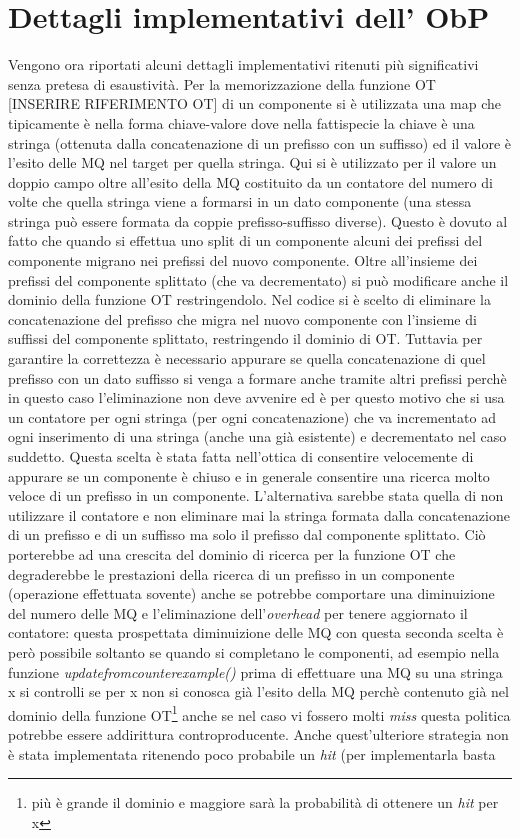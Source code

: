 \section[Dett. impl. ObP]{Dettagli implementativi dell' ObP} 
Vengono ora riportati alcuni dettagli implementativi ritenuti più significativi senza pretesa di esaustività.
Per la memorizzazione della funzione OT [INSERIRE RIFERIMENTO OT] di un componente si è utilizzata una map che tipicamente è nella forma chiave-valore dove nella fattispecie la chiave è una stringa (ottenuta dalla concatenazione di un prefisso con un suffisso) ed il valore è l'esito delle \ac{MQ} nel target per quella stringa. Qui si è utilizzato per il valore un doppio campo oltre all'esito della \ac{MQ} costituito da un contatore del numero di volte che quella stringa viene a formarsi in un dato componente (una stessa stringa può essere formata da  coppie prefisso-suffisso diverse). Questo è dovuto al fatto che quando si effettua uno split di un componente alcuni dei prefissi del componente migrano nei prefissi del nuovo componente. Oltre all'insieme dei prefissi del componente splittato (che va decrementato) si può modificare anche il dominio della funzione OT restringendolo. Nel codice si è scelto di eliminare la concatenazione del prefisso che migra nel nuovo componente con l'insieme di suffissi del componente splittato, restringendo il dominio di OT. Tuttavia per garantire la correttezza è necessario appurare se quella concatenazione di quel prefisso con un dato suffisso si venga a formare anche tramite altri prefissi perchè in questo caso l'eliminazione non deve avvenire ed è per questo motivo che si usa un contatore per ogni stringa (per ogni concatenazione) che va incrementato ad ogni inserimento di una stringa (anche una già esistente) e decrementato nel caso suddetto.  Questa scelta è stata fatta nell'ottica di consentire velocemente di appurare se un componente è chiuso e in generale consentire una ricerca molto veloce di un prefisso in un componente. L'alternativa sarebbe stata quella di non utilizzare il contatore e non eliminare mai la stringa formata dalla concatenazione di un prefisso e di un suffisso ma solo il prefisso dal componente splittato. Ciò porterebbe ad una crescita del dominio di ricerca per la funzione OT che degraderebbe le prestazioni della ricerca di un prefisso in un componente (operazione effettuata sovente) anche se potrebbe  comportare una diminuizione del numero delle \ac{MQ} e l'eliminazione dell'\textit{overhead} per tenere aggiornato il contatore: questa prospettata diminuizione delle \ac{MQ} con questa seconda scelta è però possibile soltanto se quando si completano le componenti, ad esempio nella funzione \textit{update\textunderscore{}from\textunderscore{}counterexample()} prima di effettuare una \ac{MQ} su una stringa x si controlli se per x non si conosca già l'esito della \ac{MQ} perchè contenuto già nel dominio della funzione OT\footnote{più è grande il dominio e maggiore sarà la probabilità di ottenere un \textit{hit} per x} anche se nel caso vi fossero molti \textit{miss} questa politica potrebbe essere addirittura controproducente. Anche quest'ulteriore strategia non è stata implementata ritenendo poco probabile un \textit{hit} (per implementarla basta 